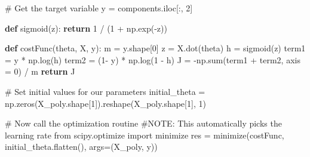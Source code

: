 \documentclass[
  letterpaper,
  DIV=11,
  numbers=noendperiod]{scrreprt}
\newenvironment{Shaded}{\begin{snugshade}}{\end{snugshade}}
\newcommand{\BuiltInTok}[1]{\textcolor[rgb]{0.00,0.23,0.31}{#1}}
\newcommand{\CommentTok}[1]{\textcolor[rgb]{0.37,0.37,0.37}{#1}}
\newcommand{\ControlFlowTok}[1]{\textcolor[rgb]{0.00,0.23,0.31}{\textbf{#1}}}
\newcommand{\DecValTok}[1]{\textcolor[rgb]{0.68,0.00,0.00}{#1}}
\newcommand{\ImportTok}[1]{\textcolor[rgb]{0.00,0.46,0.62}{#1}}
\newcommand{\KeywordTok}[1]{\textcolor[rgb]{0.00,0.23,0.31}{\textbf{#1}}}
\newcommand{\NormalTok}[1]{\textcolor[rgb]{0.00,0.23,0.31}{#1}}
\newcommand{\OperatorTok}[1]{\textcolor[rgb]{0.37,0.37,0.37}{#1}}
\begin{document}
\begin{Shaded}
\begin{Highlighting}[]
\CommentTok{\# Get the target variable}
\NormalTok{y }\OperatorTok{=}\NormalTok{ components.iloc[:, }\DecValTok{2}\NormalTok{]}
\end{Highlighting}
\end{Shaded}

\begin{Shaded}
\begin{Highlighting}[]
\KeywordTok{def}\NormalTok{ sigmoid(z):}
    \ControlFlowTok{return} \DecValTok{1} \OperatorTok{/}\NormalTok{ (}\DecValTok{1} \OperatorTok{+}\NormalTok{ np.exp(}\OperatorTok{{-}}\NormalTok{z))}
\end{Highlighting}
\end{Shaded}

\begin{Shaded}
\begin{Highlighting}[]
\KeywordTok{def}\NormalTok{ costFunc(theta, X, y):}
\NormalTok{    m }\OperatorTok{=}\NormalTok{ y.shape[}\DecValTok{0}\NormalTok{]}
\NormalTok{    z }\OperatorTok{=}\NormalTok{ X.dot(theta)}
\NormalTok{    h }\OperatorTok{=}\NormalTok{ sigmoid(z)}
\NormalTok{    term1 }\OperatorTok{=}\NormalTok{ y }\OperatorTok{*}\NormalTok{ np.log(h)}
\NormalTok{    term2 }\OperatorTok{=}\NormalTok{ (}\DecValTok{1}\OperatorTok{{-}}\NormalTok{ y) }\OperatorTok{*}\NormalTok{ np.log(}\DecValTok{1} \OperatorTok{{-}}\NormalTok{ h)}
\NormalTok{    J }\OperatorTok{=} \OperatorTok{{-}}\NormalTok{np.}\BuiltInTok{sum}\NormalTok{(term1 }\OperatorTok{+}\NormalTok{ term2, axis }\OperatorTok{=} \DecValTok{0}\NormalTok{) }\OperatorTok{/}\NormalTok{ m}
    \ControlFlowTok{return}\NormalTok{ J }
\end{Highlighting}
\end{Shaded}

\begin{Shaded}
\begin{Highlighting}[]
\CommentTok{\# Set initial values for our parameters}
\NormalTok{initial\_theta }\OperatorTok{=}\NormalTok{ np.zeros(X\_poly.shape[}\DecValTok{1}\NormalTok{]).reshape(X\_poly.shape[}\DecValTok{1}\NormalTok{], }\DecValTok{1}\NormalTok{)}
\end{Highlighting}
\end{Shaded}

\begin{Shaded}
\begin{Highlighting}[]
\CommentTok{\# Now call the optimization routine}
\CommentTok{\#NOTE: This automatically picks the learning rate}
\ImportTok{from}\NormalTok{ scipy.optimize }\ImportTok{import}\NormalTok{ minimize}
\NormalTok{res }\OperatorTok{=}\NormalTok{ minimize(costFunc, initial\_theta.flatten(), args}\OperatorTok{=}\NormalTok{(X\_poly, y))}
\end{Highlighting}
\end{Shaded}
\end{document}
